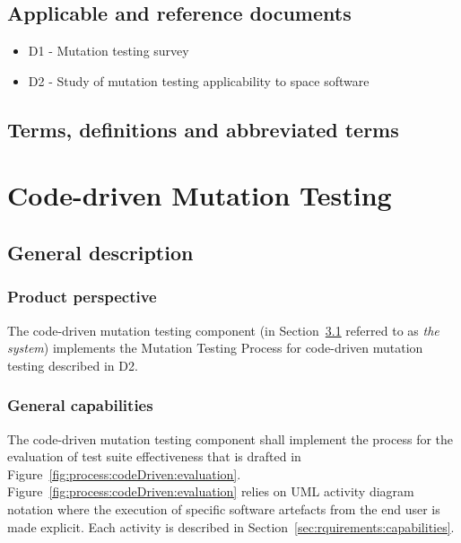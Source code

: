 
\section{Applicable and reference documents}

\begin{itemize}
\item{D1 - Mutation testing survey}
\item{D2 - Study of mutation testing applicability to space software}
\end{itemize}
\clearpage

\section{Terms, definitions and abbreviated terms}

\clearpage


\chapter{Code-driven Mutation Testing}

\section{General description}
\label{codeDriven}



\subsection{Product perspective}

\RQ{} The code-driven mutation testing component (in Section~\ref{codeDriven} referred to as \emph{the system}) implements the Mutation Testing Process for code-driven mutation testing described in D2.

\clearpage
\subsection{General capabilities}

\RQ{} The code-driven mutation testing component shall implement the process for the evaluation of test suite effectiveness that is drafted in Figure~\ref{fig:process:codeDriven:evaluation}. Figure~\ref{fig:process:codeDriven:evaluation} relies on UML activity diagram notation where the execution of specific software artefacts from the end user is made explicit. Each activity is described in Section~\ref{sec:rquirements:capabilities}.

